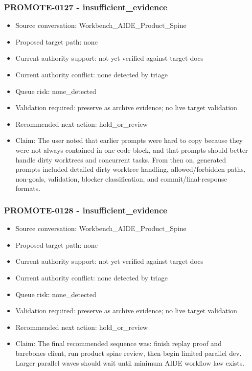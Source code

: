 \documentclass[11pt,a4paper]{report}
\begin{document}
\subsubsection{PROMOTE-0127 - insufficient\_evidence}

\begin{itemize}
\item Source conversation: Workbench\_AIDE\_Product\_Spine
\item Proposed target path: none
\item Current authority support: not yet verified against target docs
\item Current authority conflict: none detected by triage
\item Queue risk: none\_detected
\item Validation required: preserve as archive evidence; no live target validation
\item Recommended next action: hold\_or\_review
\item Claim: The user noted that earlier prompts were hard to copy because they were not always contained in one code block, and that prompts should better handle dirty worktrees and concurrent tasks. From then on, generated prompts included detailed dirty worktree handling, allowed/forbidden paths, non-goals, validation, blocker classification, and commit/final-response formats.
\end{itemize}

\subsubsection{PROMOTE-0128 - insufficient\_evidence}

\begin{itemize}
\item Source conversation: Workbench\_AIDE\_Product\_Spine
\item Proposed target path: none
\item Current authority support: not yet verified against target docs
\item Current authority conflict: none detected by triage
\item Queue risk: none\_detected
\item Validation required: preserve as archive evidence; no live target validation
\item Recommended next action: hold\_or\_review
\item Claim: The final recommended sequence was: finish replay proof and barebones client, run product spine review, then begin limited parallel dev. Larger parallel waves should wait until minimum AIDE workflow law exists.
\end{itemize}
\end{document}
